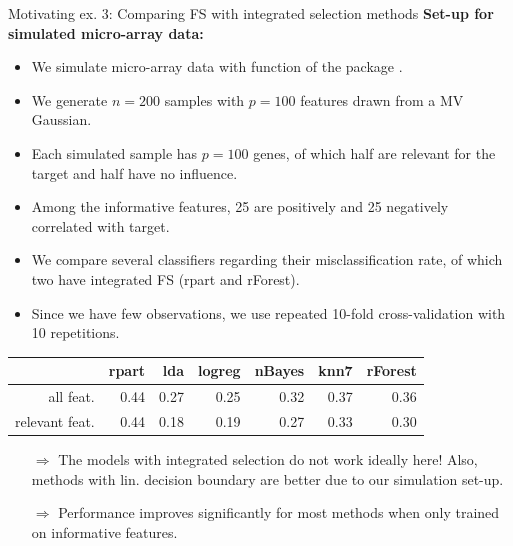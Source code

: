 \documentclass[11pt,compress,t,notes=noshow, xcolor=table]{beamer}
\begin{document}
  \begin{vbframe}{Motivating ex. 3: Comparing FS with integrated selection methods}
\textbf{Set-up for simulated micro-array data:}
\vspace{0.5cm}
  \begin{itemize}
  \setlength{\itemsep}{1.2em}
  \item We simulate micro-array data with function  of the package .
  \item We generate $n=200$ samples with $p=100$ features drawn from a MV Gaussian.
  \item Each simulated sample has $p=100$ genes, of which half are relevant for the target and half have no influence.
  \item Among the informative features, 25 are positively and 25 negatively correlated with target.
  \end{itemize}

  \framebreak

  \begin{itemize}
  \setlength{\itemsep}{1.1em}
  \item We compare several classifiers regarding their misclassification rate, of which two have integrated FS (rpart and rForest).
  \item Since we have few observations, we use repeated 10-fold cross-validation with 10 repetitions.
  \end{itemize}
  \vspace{0.2cm}
  \begin{table}[ht]
    \begin{center}
      \begin{tabular}{rrrrrrr}
        \hline
        & rpart & lda & logreg & nBayes & knn7  & rForest \\
        \hline
        all feat. & 0.44 & 0.27 & 0.25 & 0.32 & 0.37 & 0.36 \\
        relevant feat. & 0.44 & 0.18 & 0.19 & 0.27 & 0.33 & 0.30 \\
        \hline
      \end{tabular}
    \end{center}
  \end{table}
\vspace{0.1cm}
\begin{itemize}
\setlength{\itemsep}{1.0em}
    \item[$\Rightarrow$] The models with integrated selection do not work ideally here! Also, methods with lin. decision boundary are better due to our simulation set-up.
    \item[$\Rightarrow$]   Performance improves significantly for most methods when only trained on informative features.
\end{itemize}

\end{vbframe}
\end{document}
